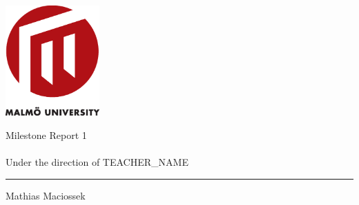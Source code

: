\begin{titlepage}
\begin{flushright}
\includegraphics[width=36mm]{images/logo}
\end{flushright}

\begin{flushleft}

\vspace{15mm}
\Huge Milestone Report 1 \\
\renewcommand{\baselinestretch}{0.98}
\Largecourse \\ Under the direction of TEACHER_NAME

\vspace{10mm}
\rule{0.95\textwidth}{0.4pt}
\vspace{10mm}



\Large %
\vspace{05mm}
Mathias Maciossek

\renewcommand{\baselinestretch}{1.0}\normalsize
\end{flushleft}
\end{titlepage}